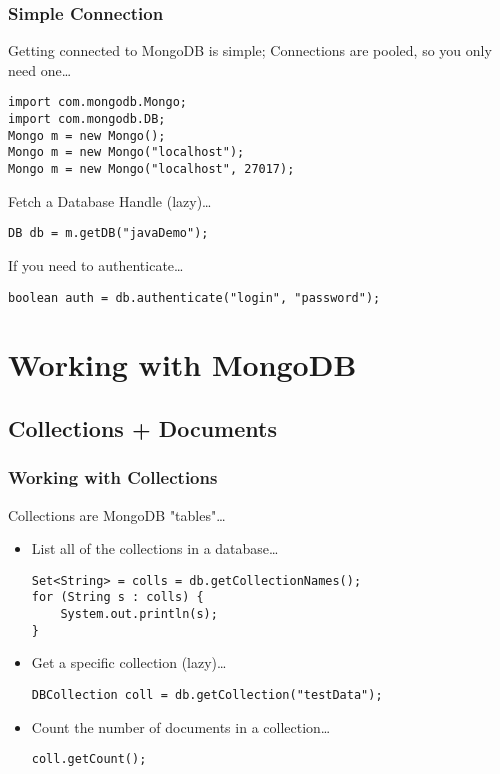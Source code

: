 \documentclass{beamer}
\begin{document}
\begin{frame}[fragile]
\frametitle{Simple Connection}
    Getting connected to MongoDB is simple; 
    Connections are pooled, so you only need one\dots\\
\begin{lstlisting} 
import com.mongodb.Mongo;
import com.mongodb.DB;
Mongo m = new Mongo();
Mongo m = new Mongo("localhost");
Mongo m = new Mongo("localhost", 27017);
\end{lstlisting}
\pause
Fetch a Database Handle (lazy)\dots
\begin{lstlisting}
DB db = m.getDB("javaDemo");
\end{lstlisting}
\pause
If you need to authenticate\dots
\begin{lstlisting}
boolean auth = db.authenticate("login", "password");
\end{lstlisting}

\end{frame}

\section{Working with MongoDB}

\subsection[Collections + Documents]{Collections + Documents}

\begin{frame}[fragile]
\frametitle{Working with Collections}
    Collections are MongoDB "tables"\dots
    \pause
    \begin{itemize}
        \item List all of the collections in a database\dots \\
\begin{lstlisting}
Set<String> = colls = db.getCollectionNames();
for (String s : colls) {
    System.out.println(s);
}
\end{lstlisting}
        \item Get a specific collection (lazy)\dots \\
\begin{lstlisting}
DBCollection coll = db.getCollection("testData");
\end{lstlisting}
        \item Count the number of documents in a collection\dots \\
\begin{lstlisting}
coll.getCount(); 
\end{lstlisting}
    \end{itemize}
\end{frame}
\end{document}
